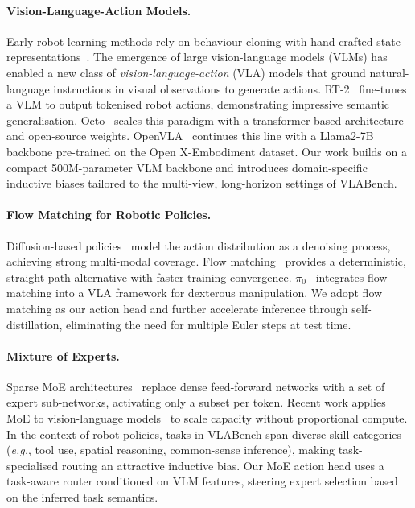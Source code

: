 \documentclass[10pt,twocolumn]{article}
\newcommand{\eg}{\textit{e.g.}}
\begin{document}
\paragraph{Vision-Language-Action Models.}
Early robot learning methods rely on behaviour cloning with hand-crafted
state representations~\cite{pomerleau1989alvinn,zhang2018deep}.
The emergence of large vision-language models (VLMs) has enabled a new class
of \emph{vision-language-action} (VLA) models that ground natural-language
instructions in visual observations to generate actions.
RT-2~\cite{brohan2023rt2} fine-tunes a VLM to output tokenised robot actions,
demonstrating impressive semantic generalisation.
Octo~\cite{team2024octo} scales this paradigm with a transformer-based
architecture and open-source weights.
OpenVLA~\cite{kim2024openvla} continues this line with a Llama2-7B backbone
pre-trained on the Open X-Embodiment dataset.
Our work builds on a compact 500M-parameter VLM backbone and introduces
domain-specific inductive biases tailored to the multi-view, long-horizon
settings of VLABench.

\paragraph{Flow Matching for Robotic Policies.}
Diffusion-based policies~\cite{chi2023diffusion} model the action distribution
as a denoising process, achieving strong multi-modal coverage.
Flow matching~\cite{lipman2022flow,albergo2023building} provides a
deterministic, straight-path alternative with faster training convergence.
$\pi_0$~\cite{black2024pi0} integrates flow matching into a VLA framework for
dexterous manipulation.
We adopt flow matching as our action head and further accelerate inference
through self-distillation, eliminating the need for multiple Euler steps at
test time.

\paragraph{Mixture of Experts.}
Sparse MoE architectures~\cite{shazeer2017outrageously,fedus2022switch} replace
dense feed-forward networks with a set of expert sub-networks, activating only
a subset per token.
Recent work applies MoE to vision-language models~\cite{lin2024moe} to scale
capacity without proportional compute.
In the context of robot policies, tasks in VLABench span diverse skill
categories (\eg, tool use, spatial reasoning, common-sense inference), making
task-specialised routing an attractive inductive bias.
Our MoE action head uses a task-aware router conditioned on VLM features,
steering expert selection based on the inferred task semantics.
\end{document}
